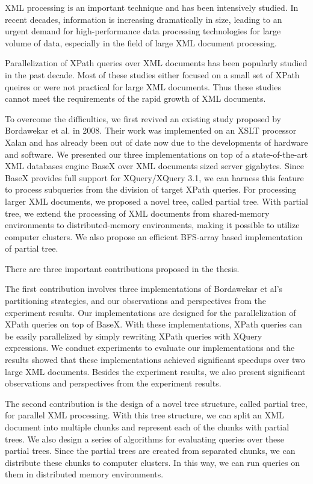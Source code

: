 \begin{abstracts}

XML processing is an important technique and has been intensively studied. In
recent decades, information is increasing dramatically in size, leading to an
urgent demand for high-performance data processing technologies for large volume
of data, especially in the field of large XML document processing.

Parallelization of XPath queries over XML documents has been popularly studied
in the past decade. Most of these studies either focused on a small set of XPath
queires or were not practical for large XML documents. Thus these studies cannot
meet the requirements of the rapid growth of XML documents.

To overcome the difficulties, we first revived an existing study proposed by
Bordawekar et al. in 2008. Their work was implemented on an XSLT processor Xalan
and has already been out of date now due to the developments of hardware and
software. We presented our three implementations on top of a state-of-the-art
XML databases engine BaseX over XML documents sized server gigabytes. Since
BaseX provides full support for XQuery/XQuery 3.1, we can harness this feature
to process subqueries from the division of target XPath queries. For processing
larger XML documents, we proposed a novel tree, called partial tree. With
partial tree, we extend the processing of XML documents from shared-memory
environments to distributed-memory environments, making it possible to utilize
computer clusters. We also propose an efficient BFS-array based implementation
of partial tree.

There are three important contributions proposed in the thesis.

The first contribution involves three implementations of Bordawekar et al's
partitioning strategies, and our observations and perspectives from the
experiment results. Our implementations are designed for the parallelization of
XPath queries on top of BaseX. With these implementations, XPath queries can be
easily parallelized by simply rewriting XPath queries with XQuery expressions.
We conduct experiments to evaluate our implementations and the results showed
that these implementations achieved significant speedups over two large XML
documents. Besides the experiment results, we also present significant
observations and perspectives from the experiment results.

The second contribution is the design of a novel tree structure, called partial
tree, for parallel XML processing. With this tree structure, we can split an XML
document into multiple chunks and represent each of the chunks with partial
trees. We also design a series of algorithms for evaluating queries over these
partial trees. Since the partial trees are created from separated chunks, we can
distribute these chunks to computer clusters. In this way, we can run queries on
them in distributed memory environments.


\end{abstracts}
